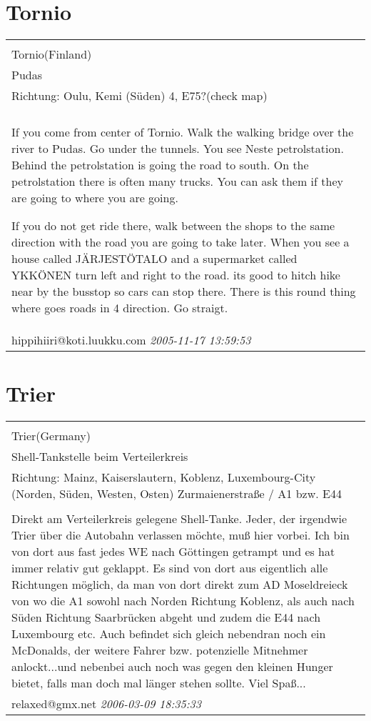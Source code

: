 \documentclass[a4paper,12pt]{article}
\begin{document}
\section{Tornio}
\begin{tabular}{|p{13cm}|}
\hline\\
Tornio(Finland)\\
Pudas\\
Richtung: Oulu, Kemi (Süden) 4, E75?(check map) \\
\hline\\
If you come from center of Tornio. Walk the walking bridge over the river to Pudas. Go under the tunnels. You see Neste petrolstation. Behind the petrolstation is going the road to south. On the petrolstation there is often many trucks. You can ask them if they are going to where you are going.

If you do not get ride there, walk between the shops to the same direction with the road you are going to take later. When you see a house called JÄRJESTÖTALO and a supermarket called YKKÖNEN turn left and right to the road. its good to hitch hike near by the busstop so cars can stop there. There is this round thing where goes roads in 4 direction. Go straigt. \\
hippihiiri@koti.luukku.com \textit{ 2005-11-17 13:59:53 }\\\hline
\end{tabular}


\section{Trier}
\begin{tabular}{|p{13cm}|}
\hline\\
Trier(Germany)\\
Shell-Tankstelle beim Verteilerkreis\\
Richtung: Mainz, Kaiserslautern, Koblenz, Luxembourg-City (Norden, Süden, Westen, Osten) Zurmaienerstraße / A1 bzw. E44 \\
\hline\\
Direkt am Verteilerkreis gelegene Shell-Tanke. Jeder, der irgendwie Trier über die Autobahn verlassen möchte, muß hier vorbei. Ich bin von dort aus fast jedes WE nach Göttingen getrampt und es hat immer relativ gut geklappt.
Es sind von dort aus eigentlich alle Richtungen möglich, da man von dort direkt zum AD Moseldreieck von wo die A1 sowohl nach Norden Richtung Koblenz, als auch nach Süden Richtung Saarbrücken abgeht und zudem die E44 nach Luxembourg etc.
Auch befindet sich gleich nebendran noch ein McDonalds, der weitere Fahrer bzw. potenzielle Mitnehmer anlockt...und nebenbei auch noch was gegen den kleinen Hunger bietet, falls man doch mal länger stehen sollte. Viel Spaß... \\
relaxed@gmx.net \textit{ 2006-03-09 18:35:33 }\\\hline
\end{tabular}
\end{document}
